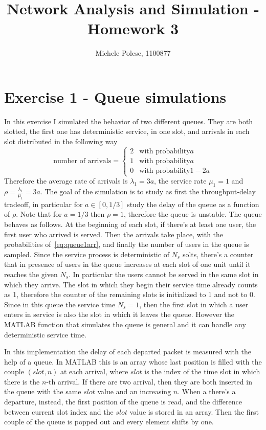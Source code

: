 \documentclass[10pt]{article}
\begin{document}
\title{Network Analysis and Simulation - Homework 3}
\author{Michele Polese, 1100877}

\maketitle

\section*{Exercise 1 - Queue simulations}
In this exercise I simulated the behavior of two different queues. They are both slotted, the first one has deterministic service, in one slot, and arrivals in each slot distributed in the following way
\begin{equation}
  \mbox{number of arrivals} = 
  \begin{cases}
    2 & \mbox{with probability} a\\
    1 & \mbox{with probability} a\\
    0 & \mbox{with probability} 1-2a
  \end{cases}
  \label{eq:queue1arr}
\end{equation}
Therefore the average rate of arrivals is $\lambda_1 = 3a$, the service rate $\mu_1 = 1$ and $\rho = \frac{\lambda_1}{\mu_1} = 3a$. 
The goal of the simulation is to study as first the throughput-delay tradeoff, in particular for $a \in [0, 1/3]$ study the delay of the queue as a function of $\rho$. Note that for $a = 1/3$ then $\rho = 1$, therefore the queue is unstable. 
The queue behaves as follows. At the beginning of each slot, if there's at least one user, the first user who arrived is served. Then the arrivals take place, with the probabilities of~\eqref{eq:queue1arr}, and finally the number of users in the queue is sampled. Since the service process is deterministic of $N_s$ solts, there's a counter that in presence of users in the queue increases at each slot of one unit until it reaches the given $N_s$. In particular the users cannot be served in the same slot in which they arrive. The slot in which they begin their service time already counts as 1, therefore the counter of the remaining slots is initialized to 1 and not to 0. Since in this queue the service time $N_s = 1$, then the first slot in which a user enters in service is also the slot in which it leaves the queue. However the MATLAB function that simulates the queue is general and it can handle any deterministic service time. 

In this implementation the delay of each departed packet is measured with the help of a queue. In MATLAB this is an array whose last position is filled with the couple $(slot, n)$ at each arrival, where $slot$ is the index of the time slot in which there is the $n$-th arrival. If there are two arrival, then they are both inserted in the queue with the same $slot$ value and an increasing $n$. When a there's a departure, instead, the first position of the queue is read, and the difference between current slot index and the $slot$ value is stored in an array. Then the first couple of the queue is popped out and every element shifts by one. 
\end{document}
